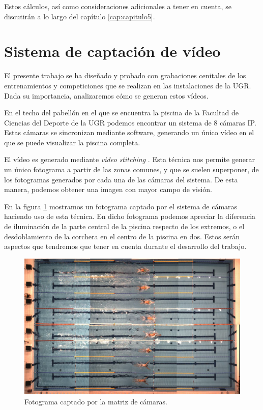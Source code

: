 Estos cálculos, así como consideraciones adicionales a tener en cuenta, se discutirán a lo largo del capítulo \ref{cap:capitulo5}.

\section{Sistema de captación de vídeo}

El presente trabajo se ha diseñado y probado con grabaciones cenitales de los entrenamientos y competiciones que se realizan en las instalaciones de la UGR. Dada su importancia, analizaremos cómo se generan estos vídeos.

En el techo del pabellón en el que se encuentra la piscina de la Facultad de Ciencias del Deporte de la UGR podemos encontrar un sistema de 8 cámaras IP. Estas cámaras se sincronizan mediante software, generando un único vídeo en el que se puede visualizar la piscina completa.

El vídeo es generado mediante \textit{video stitching} \cite{LYU201955}. Esta técnica nos permite generar un único fotograma a partir de las zonas comunes, y que se suelen superponer, de los fotogramas generados por cada una de las cámaras del sistema. De esta manera, podemos obtener una imagen con mayor campo de visión. 

En la figura \ref{fig:pisicinaprimerjemeplo} mostramos un fotograma captado por el sistema de cámaras haciendo uso de esta técnica. En dicho fotograma podemos apreciar la diferencia de iluminación de la parte central de la piscina respecto de los extremos, o el desdoblamiento de la corchera en el centro de la piscina en dos. Estos serán aspectos que tendremos que tener en cuenta durante el desarrollo del trabajo.

\begin{figure}
    \centering
    \includegraphics[width=\textwidth,height=\textheight,keepaspectratio]{imagenes/parte_BS/piscina_completa.png}    
    \caption{Fotograma captado por la matriz de cámaras.}
    \label{fig:pisicinaprimerjemeplo}
\end{figure}

